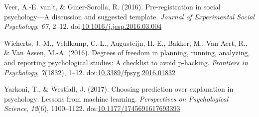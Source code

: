 \documentclass[man,floatsintext]{apa6}
\begin{document}
\hypertarget{ref-vantveer_2016}{}
Veer, A.-E. van't, \& Giner-Sorolla, R. (2016). Pre-registration in
social psychology---A discussion and suggested template. \emph{Journal
of Experimental Social Psychology}, \emph{67}, 2--12.
doi:\href{https://doi.org/10.1016/j.jesp.2016.03.004}{10.1016/j.jesp.2016.03.004}

\hypertarget{ref-Wicherts_et_al_2016}{}
Wicherts, J.-M., Veldkamp, C.-L., Augusteijn, H.-E., Bakker, M., Van
Aert, R., \& Van Assen, M.-A. (2016). Degrees of freedom in planning,
running, analyzing, and reporting psychological studies: A checklist to
avoid p-hacking. \emph{Frontiers in Psychology}, \emph{7}(1832), 1--12.
doi:\href{https://doi.org/10.3389/fpsyg.2016.01832}{10.3389/fpsyg.2016.01832}

\hypertarget{ref-Yarkoni_Westfall_2017}{}
Yarkoni, T., \& Westfall, J. (2017). Choosing prediction over
explanation in psychology: Lessons from machine learning.
\emph{Perspectives on Psychological Science}, \emph{12}(6), 1100--1122.
doi:\href{https://doi.org/10.1177/1745691617693393}{10.1177/1745691617693393}
\end{document}
